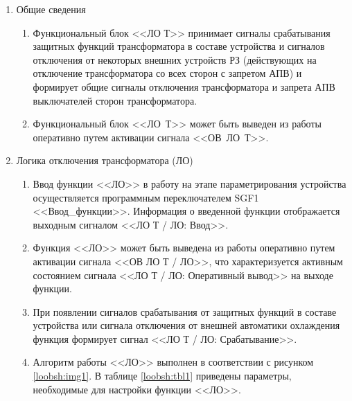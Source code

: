 \documentclass[a4paper, 12pt,table, hidelinks, DIV=calc]{extarticle} %
\begin{document}
\begin{enumerate}[label=\arabic{section}.\arabic{subsection}.\arabic{enumi}, labelsep=4pt, leftmargin=0pt, itemindent=57pt, itemsep=0pt, parsep=5pt] %

\item Общие сведения

\begin{enumerate}[label=\arabic{section}.\arabic{subsection}.\arabic{enumi}.\arabic*, labelsep=4pt, leftmargin=0em, itemindent=65pt, parsep=0pt]

\item
Функциональный блок <<ЛО Т>> принимает сигналы срабатывания защитных функций трансформатора в составе устройства и сигналов отключения от некоторых внешних устройств РЗ (действующих на отключение трансформатора со всех сторон с запретом АПВ) и формирует общие сигналы отключения трансформатора и запрета АПВ выключателей сторон трансформатора.
\item
Функциональный блок <<ЛО~Т>> может быть выведен из работы оперативно путем активации сигнала <<ОВ~ЛО~Т>>.

\end{enumerate}

\item Логика отключения трансформатора (ЛО)

\begin{enumerate}[label=\arabic{section}.\arabic{subsection}.\arabic{enumi}.\arabic*, labelsep=4pt, leftmargin=0em, itemindent=65pt, parsep=0pt]

\item
Ввод функции <<ЛО>> в работу на этапе параметрирования устройства осуществляется программным переключателем SGF1 <<Ввод\_функции>>. Информация о введенной функции отображается выходным сигналом <<ЛО Т / ЛО: Ввод>>.
\item
Функция <<ЛО>> может быть выведена из работы оперативно путем активации сигнала <<ОВ ЛО Т / ЛО>>, что характеризуется активным состоянием сигнала <<ЛО Т / ЛО: Оперативный вывод>> на выходе функции.
\item
При появлении сигналов срабатывания от защитных функций в составе устройства или сигнала отключения от внешней автоматики охлаждения функция формирует сигнал <<ЛО Т / ЛО: Срабатывание>>.
\item
Алгоритм работы <<ЛО>> выполнен в соответствии с рисунком \ref{loobsh:img1}. В таблице \ref{loobsh:tbl1} приведены параметры, необходимые для настройки функции <<ЛО>>.


\end{enumerate}
\end{enumerate}
\end{document}
